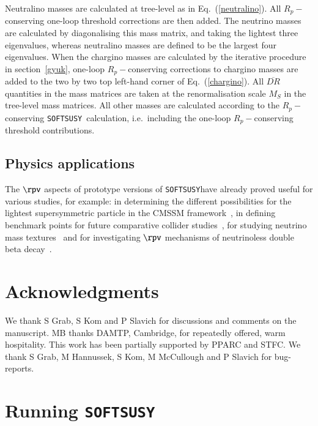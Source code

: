 \documentclass[final,3p,times,pdflatex]{elsarticle}
\def\SOFTSUSY{{\tt SOFTSUSY}}
\begin{document}
Neutralino masses are calculated at tree-level as in Eq.~(\ref{neutralino}). 
All $R_p-$conserving one-loop threshold corrections are then added. The
neutrino masses are calculated by diagonalising this 
mass matrix, and taking the lightest three eigenvalues, whereas neutralino
masses are defined to be the largest four eigenvalues. 
When the chargino masses are calculated by the iterative procedure in
section~\ref{gyuk}, one-loop $R_p-$conserving corrections to
chargino masses are added to the two by two top left-hand corner of
Eq.~(\ref{chargino}). 
All $\overline{DR}$ quantities in the mass matrices are taken at the
renormalisation scale
$M_S$ in the tree-level mass matrices.  All other
masses are calculated according to the $R_p-$conserving \SOFTSUSY~calculation,
i.e.\ including the one-loop $R_p-$conserving threshold contributions.

\subsection{Physics applications}
The $\rpv$ aspects of prototype versions of \SOFTSUSY have already proved
useful for various 
studies, for example: in determining the different possibilities for the lightest
supersymmetric particle in the CMSSM
framework~\cite{Dreiner:2008ca,Bernhardt:2008jz}, in defining benchmark points
for future comparative collider studies~\cite{Allanach:2006st}, for studying
neutrino mass textures~\cite{Allanach:2007qc} and for investigating $\rpv$
mechanisms of neutrinoless double beta
decay~\cite{Allanach:2009iv,Allanach:2009xx}. 

\section*{Acknowledgments}
We thank S Grab, S Kom and P Slavich for discussions and 
comments on the manuscript.
MB thanks DAMTP, Cambridge, for repeatedly
offered, warm hospitality. This work has been partially supported by PPARC and
STFC\@. We thank S Grab, M Hannussek, S Kom, M McCullough and P Slavich for
bug-reports. 


\appendix

\section{Running \SOFTSUSY}
\label{sec:run}
\end{document}
